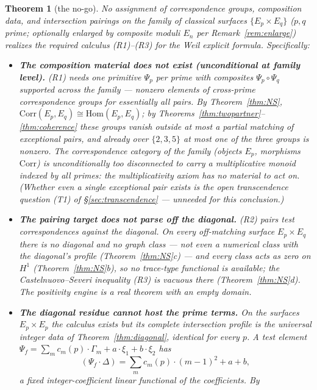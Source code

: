 \documentclass[11pt]{article}
\newtheorem{theorem}{Theorem}
\theoremstyle{definition}
\theoremstyle{remark}
\newcommand{\Hom}{\mathrm{Hom}}
\newcommand{\Corr}{\mathrm{Corr}}
\begin{document}
\begin{theorem}[the no-go]
\label{thm:nogo}
No assignment of correspondence groups, composition data, and intersection
pairings on the family of classical surfaces $\{E_p \times E_q\}$ ($p, q$
prime; optionally enlarged by composite moduli $E_n$ per
Remark~\ref{rem:enlarge}) realizes the required calculus
\textup{(R1)}--\textup{(R3)} for the Weil explicit formula. Specifically:
\begin{itemize}
\item[\textup{(O1)}] \textbf{The composition material does not exist
(unconditional at family level).} \textup{(R1)} needs one primitive $\Psi_p$
per prime with composites $\Psi_p \circ \Psi_q$ supported across the
family --- nonzero elements of cross-prime correspondence groups for
essentially all pairs. By Theorem~\ref{thm:NS},
$\Corr(E_p, E_q) \cong \Hom(E_p, E_q)$; by
Theorems~\ref{thm:twopartner}--\ref{thm:coherence} these groups vanish
outside at most a partial matching of exceptional pairs, and already over
$\{2,3,5\}$ at most one of the three groups is nonzero. The correspondence
category of the family (objects $E_p$, morphisms $\Corr$) is unconditionally
too disconnected to carry a multiplicative monoid indexed by all primes: the
multiplicativity axiom has no material to act on. (Whether even a single
exceptional pair exists is the open transcendence question (T1) of
\S\ref{sec:transcendence} --- unneeded for this conclusion.)
\item[\textup{(O2)}] \textbf{The pairing target does not parse off the
diagonal.} \textup{(R2)} pairs test correspondences against the diagonal. On
every off-matching surface $E_p \times E_q$ there is no diagonal and no
graph class --- not even a numerical class with the diagonal's profile
(Theorem~\ref{thm:NS}c) --- and every class acts as zero on $H^1$
(Theorem~\ref{thm:NS}b), so no trace-type functional is available; the
Castelnuovo--Severi inequality \textup{(R3)} is vacuous there
(Theorem~\ref{thm:NS}d). The positivity engine is a real theorem with an
empty domain.
\item[\textup{(O3)}] \textbf{The diagonal residue cannot host the prime
terms.} On the surfaces $E_p \times E_p$ the calculus exists but its
complete intersection profile is the universal integer data of
Theorem~\ref{thm:diagonal}, identical for every $p$. A test element
$\Psi_f = \sum_m c_m(p)\cdot\Gamma_m + a\cdot\xi_1 + b\cdot\xi_2$ has
\[
(\Psi_f \cdot \Delta) = \sum_m c_m(p)\cdot(m-1)^2 + a + b ,
\]
a fixed integer-coefficient linear functional of the coefficients. By

\end{itemize}
\end{theorem}
\end{document}
